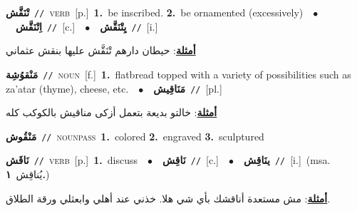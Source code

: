 \documentclass[10pt,a4paper,twoside]{article} %
\begin{document}
\begin{multicols}{2}
{\setlength\topsep{0pt}\textbf{\foreignlanguage{arabic}{تْنَقَّش}}\ {\color{gray}\texttt{//}\color{black}}\ \textsc{verb}\ [p.]\ \textbf{1.}~be inscribed.  \textbf{2.}~be ornamented (excessively)\ \ $\bullet$\ \ \setlength\topsep{0pt}\textbf{\foreignlanguage{arabic}{اِتْنَقَّش}}\ {\color{gray}\texttt{//}\color{black}}\ [c.]\ \ $\bullet$\ \ \setlength\topsep{0pt}\textbf{\foreignlanguage{arabic}{يِتْنَقَّش}}\ {\color{gray}\texttt{//}\color{black}}\ [i.]\  \begin{flushright}\color{gray}\foreignlanguage{arabic}{\textbf{\underline{\foreignlanguage{arabic}{أمثلة}}}: حيطان دارهم تْنَقَّش عليها بنقش عثماني}\end{flushright}\color{black}} \vspace{2mm}

{\setlength\topsep{0pt}\textbf{\foreignlanguage{arabic}{مَنْقوُشِة}}\ {\color{gray}\texttt{//}\color{black}}\ \textsc{noun}\ [f.]\ \textbf{1.}~flatbread topped with a variety of possibilities such as za'atar (thyme), cheese, etc.\ \ $\bullet$\ \ \setlength\topsep{0pt}\textbf{\foreignlanguage{arabic}{مَنَاقِيش}}\ {\color{gray}\texttt{//}\color{black}}\ [pl.]\  \begin{flushright}\color{gray}\foreignlanguage{arabic}{\textbf{\underline{\foreignlanguage{arabic}{أمثلة}}}: خالتو بديعة بتعمل أزكى مناقيش بالكوكب كله}\end{flushright}\color{black}} \vspace{2mm}

{\setlength\topsep{0pt}\textbf{\foreignlanguage{arabic}{مَنْقُوش}}\ {\color{gray}\texttt{//}\color{black}}\ \textsc{noun\textunderscore pass}\ \textbf{1.}~colored  \textbf{2.}~engraved  \textbf{3.}~sculptured\ } \vspace{2mm}

{\setlength\topsep{0pt}\textbf{\foreignlanguage{arabic}{نَاقَش}}\ {\color{gray}\texttt{//}\color{black}}\ \textsc{verb}\ [p.]\ \textbf{1.}~discuss\ \ $\bullet$\ \ \setlength\topsep{0pt}\textbf{\foreignlanguage{arabic}{نَاقِش}}\ {\color{gray}\texttt{//}\color{black}}\ [c.]\ \ $\bullet$\ \ \setlength\topsep{0pt}\textbf{\foreignlanguage{arabic}{ينَاقِش}}\ {\color{gray}\texttt{//}\color{black}}\ [i.]\ \color{gray}(msa. \foreignlanguage{arabic}{يُناقِش}~\foreignlanguage{arabic}{\textbf{١.}})\color{black}\  \begin{flushright}\color{gray}\foreignlanguage{arabic}{\textbf{\underline{\foreignlanguage{arabic}{أمثلة}}}: مش مستعدة أناقشك بأي شي هلا. خذني عند أهلي وابعثلي ورقة الطلاق.}\end{flushright}\color{black}} \vspace{2mm}


\end{multicols}
\end{document}
